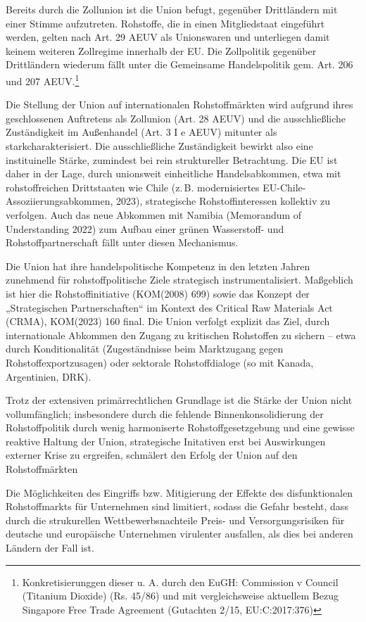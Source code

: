 \documentclass[12pt,a4paper,oneside]{book} %
\begin{document}
Bereits durch die Zollunion ist die Union befugt, gegenüber Drittländern mit einer Stimme aufzutreten. Rohstoffe, die in einen Mitgliedstaat eingeführt werden, gelten nach Art. 29 AEUV als Unionswaren und unterliegen damit keinem weiteren Zollregime innerhalb der EU. Die Zollpolitik gegenüber Drittländern wiederum fällt unter die Gemeinsame Handelspolitik gem. Art. 206 und 207 AEUV.\footnote{Konkretisierunggen dieser u. A. durch den EuGH: Commission v Council (Titanium Dioxide) (Rs. 45/86) und mit vergleichsweise aktuellem Bezug Singapore Free Trade Agreement (Gutachten 2/15, EU:C:2017:376)}

Die Stellung der Union auf internationalen Rohstoffmärkten wird aufgrund ihres geschlossenen Auftretens als Zollunion (Art. 28 AEUV) und die ausschließliche Zuständigkeit im Außenhandel (Art. 3 I e AEUV) mitunter als \glqq stark\grqq charakterisiert.\autocite{Schorkopf, Rohstoffverwaltung, Rn. 34.} Die ausschließliche Zuständigkeit bewirkt also eine instituinelle Stärke, zumindest bei rein struktureller Betrachtung. Die EU ist daher in der Lage, durch unionsweit einheitliche Handelsabkommen, etwa mit rohstoffreichen Drittstaaten wie Chile (z. B. modernisiertes EU-Chile-Assoziierungsabkommen, 2023), strategische Rohstoffinteressen kollektiv zu verfolgen. Auch das neue Abkommen mit Namibia (Memorandum of Understanding 2022) zum Aufbau einer grünen Wasserstoff- und Rohstoffpartnerschaft fällt unter diesen Mechanismus.

Die Union hat ihre handelspolitische Kompetenz in den letzten Jahren zunehmend für rohstoffpolitische Ziele strategisch instrumentalisiert. Maßgeblich ist hier die Rohstoffinitiative (KOM(2008) 699) sowie das Konzept der „Strategischen Partnerschaften“ im Kontext des Critical Raw Materials Act (CRMA), KOM(2023) 160 final. Die Union verfolgt explizit das Ziel, durch internationale Abkommen den Zugang zu kritischen Rohstoffen zu sichern -- etwa durch Konditionalität (Zugeständnisse beim Marktzugang gegen Rohstoffexportzusagen) oder sektorale Rohstoffdialoge (so mit Kanada, Argentinien, DRK).

Trotz der extensiven primärrechtlichen Grundlage ist die Stärke der Union nicht vollumfänglich; insbesondere durch die fehlende Binnenkonsolidierung der Rohstoffpolitik durch wenig harmoniserte Rohstoffgesetzgebung und eine gewisse reaktive Haltung der Union, strategische Initativen erst bei Auswirkungen externer Krise zu ergreifen, schmälert den Erfolg der Union auf den Rohstoffmärkten

Die Möglichkeiten des Eingriffs bzw. Mitigierung der Effekte des disfunktionalen Rohstoffmarkts für Unternehmen sind limitiert, sodass die Gefahr besteht, dass durch die strukurellen Wettbewerbsnachteile Preis- und Versorgungsrisiken für deutsche und europäische Unternehmen virulenter ausfallen, als dies bei anderen Ländern der Fall ist.\autocite{ISW, Rohstoffe für die Industrie, S. 8}
\end{document}

